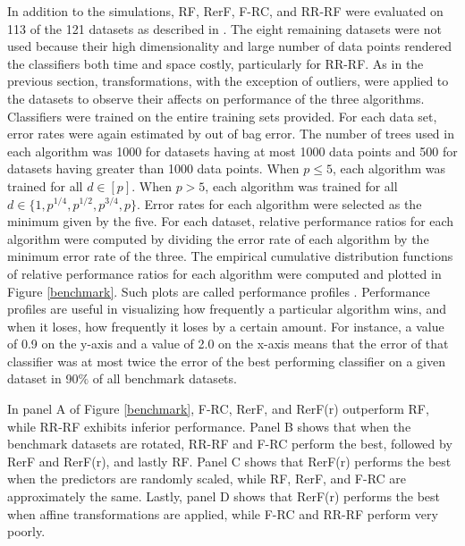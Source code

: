 In addition to the simulations, RF, RerF, F-RC, and RR-RF were evaluated on 113 of the 121 datasets as described in \cite{Delgado2014}. The eight remaining datasets were not used because their high dimensionality and large number of data points rendered the classifiers both time and space costly, particularly for RR-RF. As in the previous section, transformations, with the exception of outliers, were applied to the datasets to observe their affects on performance of the three algorithms. Classifiers were trained on the entire training sets provided. For each data set, error rates were again estimated by out of bag error. The number of trees used in each algorithm was 1000 for datasets having at most 1000 data points and 500 for datasets having greater than 1000 data points. When $p \leq 5$, each algorithm was trained for all $d \in [p]$. When $p > 5$, each algorithm was trained for all $d \in \{1,p^{1/4},p^{1/2},p^{3/4},p\}$. Error rates for each algorithm were selected as the minimum given by the five. For each dataset, relative performance ratios for each algorithm were computed by dividing the error rate of each algorithm by the minimum error rate of the three. The empirical cumulative distribution functions of relative performance ratios for each algorithm were computed and plotted in Figure \ref{benchmark}. Such plots are called performance profiles \cite{Dolan2002}. Performance profiles are useful in visualizing how frequently a particular algorithm wins, and when it loses, how frequently it loses by a certain amount. For instance, a value of 0.9 on the y-axis and a value of 2.0 on the x-axis means that the error of that classifier was at most twice the error of the best performing classifier on a given dataset in 90$\%$ of all benchmark datasets. 

In panel A of Figure \ref{benchmark}, F-RC, RerF, and RerF(r) outperform RF, while RR-RF exhibits inferior performance. Panel B shows that when the benchmark datasets are rotated, RR-RF and F-RC perform the best, followed by RerF and RerF(r), and lastly RF. Panel C shows that RerF(r) performs the best when the predictors are randomly scaled, while RF, RerF, and F-RC are approximately the same. Lastly, panel D shows that RerF(r) performs the best when affine transformations are applied, while F-RC and RR-RF perform very poorly. 

